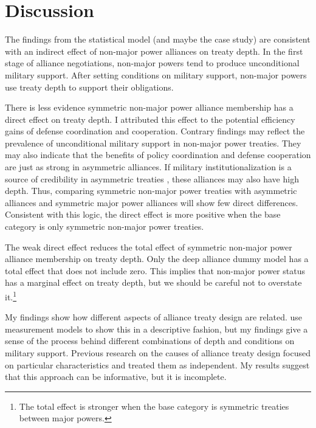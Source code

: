 \documentclass[12pt]{article}
\begin{document}
\section{Discussion}


The findings from the statistical model (and maybe the case study) are consistent with an indirect effect of non-major power alliances on treaty depth. 
In the first stage of alliance negotiations, non-major powers tend to produce unconditional military support. 
After setting conditions on military support, non-major powers use treaty depth to support their obligations. 


There is less evidence symmetric non-major power alliance membership has a direct effect on treaty depth.
I attributed this effect to the potential efficiency gains of defense coordination and cooperation.  
Contrary findings may reflect the prevalence of unconditional military support in non-major power treaties. 
They may also indicate that the benefits of policy coordination and defense cooperation are just as strong in asymmetric alliances. 
If military institutionalization is a source of credibility in asymmetric treaties \citep{Mattes2012}, these alliances may also have high depth. 
Thus, comparing symmetric non-major power treaties with asymmetric alliances and symmetric major power alliances will show few direct differences.
Consistent with this logic, the direct effect is more positive when the base category is only symmetric non-major power treaties.  


The weak direct effect reduces the total effect of symmetric non-major power alliance membership on treaty depth. 
Only the deep alliance dummy model has a total effect that does not include zero. 
This implies that non-major power status has a marginal effect on treaty depth, but we should be careful not to overstate it.\footnote{The total effect is stronger when the base category is symmetric treaties between major powers.}


My findings show how different aspects of alliance treaty design are related. 
\citet{BensonClinton2016} use measurement models to show this in a descriptive fashion, but my findings give a sense of the process behind different combinations of depth and conditions on military support. 
Previous research on the causes of alliance treaty design \citep{Benson2012, Mattes2012, Chibaetal2015} focused on particular characteristics and treated them as independent. 
My results suggest that this approach can be informative, but it is incomplete. 
\end{document}
